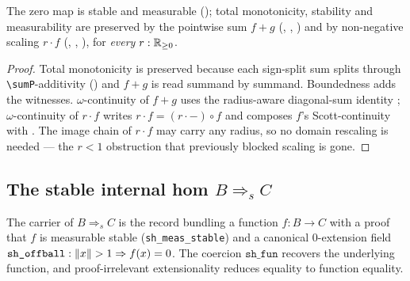 \begin{lemma}\label{lem:stable-closure}
\rocqok
{}\rocqok
{}
The zero map is stable and measurable
(); total monotonicity,
stability and measurability are preserved by the pointwise sum $f + g$
(,
,
) and by non-negative
scaling $r \cdot f$
(,
,
), for \emph{every}
$r : \mathbb{R}_{\geq 0}$.
\end{lemma}

\begin{proof}
Total monotonicity is preserved because each sign-split sum splits
through \texttt{\textbackslash sumP}-additivity () and
$f + g$ is read summand by summand. Boundedness adds the witnesses.
$\omega$-continuity of $f + g$ uses the radius-aware diagonal-sum
identity ; $\omega$-continuity
of $r \cdot f$ writes $r \cdot f = (r \cdot {-}) \circ f$ and composes
$f$'s Scott-continuity with
. The image
chain of $r \cdot f$ may carry any radius, so no domain rescaling is
needed --- the $r < 1$ obstruction that previously blocked scaling is
gone.
\end{proof}

\subsection{The stable internal hom \texorpdfstring{$B \mathbin{\Rightarrow_s} C$}{B Rightarrow_s C}}

\begin{definition}
\label{def:stablehom}
\rocqok{}
The carrier of $B \mathbin{\Rightarrow_s} C$ is the record
 bundling a function
$f : B \to C$ with a proof that $f$ is measurable stable
(\texttt{sh\_meas\_stable}) and a canonical $0$-extension field
$\texttt{sh\_offball} : \lVert x \rVert > 1 \Rightarrow f(x) = 0$. The
coercion $\texttt{sh\_fun}$ recovers the underlying function, and
proof-irrelevant extensionality
 reduces equality to function
equality.
\end{definition}

